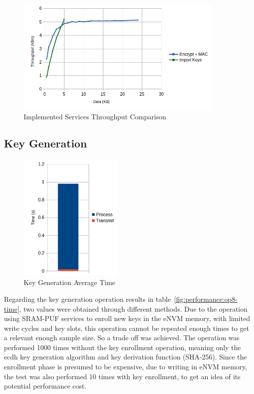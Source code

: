 \begin{figure}[h!]
	\centering
	\includegraphics[width=0.9\textwidth]{./Images/services-tput.png}
	\caption{Implemented Services Throughput Comparison}
	\label{fig:performance:services-tput}
\end{figure}

\subsection{Key Generation}\label{chap:evaluation:services:key-gen}

\begin{figure}[h!]
	\centering
	\includegraphics[width=0.45\textwidth]{./Images/new-key-time.png}
	\caption{Key Generation Average Time}
	\label{fig:performance:new-key-time}
\end{figure}

Regarding the key generation operation results in table~\ref{fig:performance:op8-time}, two values were obtained through different methods. Due to the operation using SRAM-PUF services to enroll new keys in the eNVM memory, with limited write cycles and key slots, this operation cannot be repeated enough times to get a relevant enough sample size.
So a trade off was achieved. The operation was performed 1000 times without the key enrollment operation, meaning only the ecdh key generation algorithm and key derivation function (SHA-256).
Since the enrollment phase is presumed to be expensive, due to writing in eNVM memory, the test was also performed 10 times with key enrollment, to get an idea of its potential performance cost.

